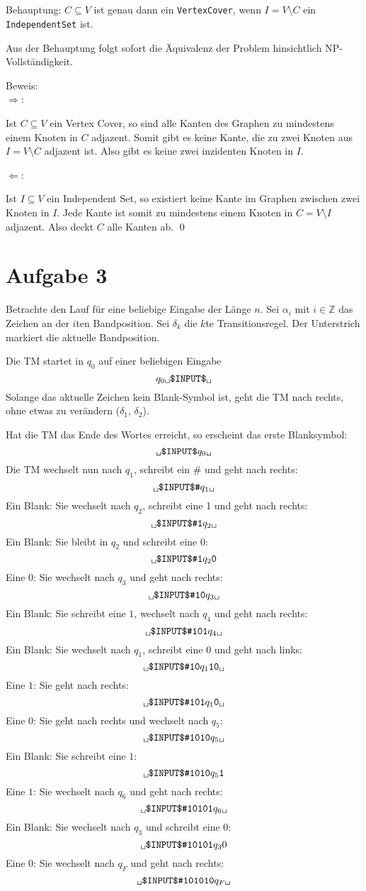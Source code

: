 \documentclass[a4paper]{article}
\newcommand{\tvs}{\textvisiblespace}
\begin{document}
\subsection{}
Behauptung: $C \subseteq V$ ist genau dann ein \texttt{VertexCover}, wenn $I = V \setminus C$ ein \texttt{IndependentSet} ist.

Aus der Behauptung folgt sofort die Äquivalenz der Problem hinsichtlich NP-Vollständigkeit.

Beweis: \\
$\Rightarrow$:

Ist $C \subseteq V$ ein Vertex Cover, so sind alle Kanten des Graphen zu mindestens einem Knoten in $C$ adjazent.
Somit gibt es keine Kante, die zu zwei Knoten aus $I = V \setminus C$ adjazent ist.
Also gibt es keine zwei inzidenten Knoten in $I$.

$\Leftarrow$:

Ist $I \subseteq V$ ein Independent Set, so existiert keine Kante im Graphen zwischen zwei Knoten in $I$.
Jede Kante ist somit zu mindestens einem Knoten in $C = V \setminus I$ adjazent.
Also deckt $C$ alle Kanten ab.
\hfill{}\qed{}

\section{Aufgabe 3}

Betrachte den Lauf für eine beliebige Eingabe der Länge $n$.
Sei $\alpha_i$ mit $i \in \mathbb{Z}$ das Zeichen an der $i$ten Bandposition.
Sei $\delta_k$ die $k$te Transitionsregel.
Der Unterstrich markiert die aktuelle Bandposition.


Die TM startet in $q_0$ auf einer beliebigen Eingabe
\[ \texttt{$q_0$\tvs\$INPUT\$\tvs} \]
Solange das aktuelle Zeichen kein Blank-Symbol ist,
geht die TM nach rechts, ohne etwas zu verändern ($\delta_1$, $\delta_2$).

Hat die TM das Ende des Wortes erreicht, so erscheint das erste Blanksymbol:
\[ \texttt{\tvs\$INPUT\$$q_0$\tvs} \]
Die TM wechselt nun nach $q_1$, schreibt ein \# und geht nach rechts:
\[ \texttt{\tvs\$INPUT\$\#$q_1$\tvs} \]
Ein Blank: Sie wechselt nach $q_2$, schreibt eine 1 und geht nach rechts:
\[ \texttt{\tvs\$INPUT\$\#1$q_2$\tvs} \]
Ein Blank: Sie bleibt in $q_2$ und schreibt eine $0$:
\[ \texttt{\tvs\$INPUT\$\#1$q_2$0} \]
Eine $0$: Sie wechselt nach $q_3$ und geht nach rechts:
\[ \texttt{\tvs\$INPUT\$\#10$q_3$\tvs} \]
Ein Blank: Sie schreibt eine $1$, wechselt nach $q_4$ und geht nach rechts:
\[ \texttt{\tvs\$INPUT\$\#101$q_4$\tvs} \]
Ein Blank: Sie wechselt nach $q_1$, schreibt eine $0$ und geht nach links:
\[ \texttt{\tvs\$INPUT\$\#10$q_1$10\tvs} \]
Eine $1$: Sie geht nach rechts:
\[ \texttt{\tvs\$INPUT\$\#101$q_1$0\tvs} \]
Eine $0$: Sie geht nach rechts und wechselt nach $q_5$:
\[ \texttt{\tvs\$INPUT\$\#1010$q_5$\tvs} \]
Ein Blank: Sie schreibt eine $1$:
\[ \texttt{\tvs\$INPUT\$\#1010$q_5$1} \]
Eine $1$: Sie wechselt nach $q_6$ und geht nach rechts:
\[ \texttt{\tvs\$INPUT\$\#10101$q_6$\tvs} \]
Ein Blank: Sie wechselt nach $q_3$ und schreibt eine $0$:
\[ \texttt{\tvs\$INPUT\$\#10101$q_3$}0 \]
Eine $0$: Sie wechselt nach $q_F$ und geht nach rechts:
\[ \texttt{\tvs\$INPUT\$\#101010$q_F$\tvs} \]
\end{document}
